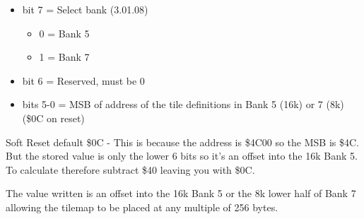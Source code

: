 \begin{itemize}
\item bit 7 = Select bank (3.01.08)
\begin{itemize}
\item[] 0 = Bank 5
\item[] 1 = Bank 7
\end{itemize}
\item bit 6 = Reserved, must be 0
\item bits 5-0 = MSB of address of the tile definitions in Bank 5 (16k) or 7
(8k) (\$0C on reset)
\end{itemize}
Soft Reset default \$0C - This is because the address is \$4C00 so the
MSB is \$4C. But the stored value is only the lower 6 bits so it's an
offset into the 16k Bank 5. To calculate therefore subtract \$40
leaving you with \$0C.

The value written is an offset into the 16k Bank 5 or the 8k lower
half of Bank 7 allowing the tilemap to be placed at any multiple of
256 bytes.
